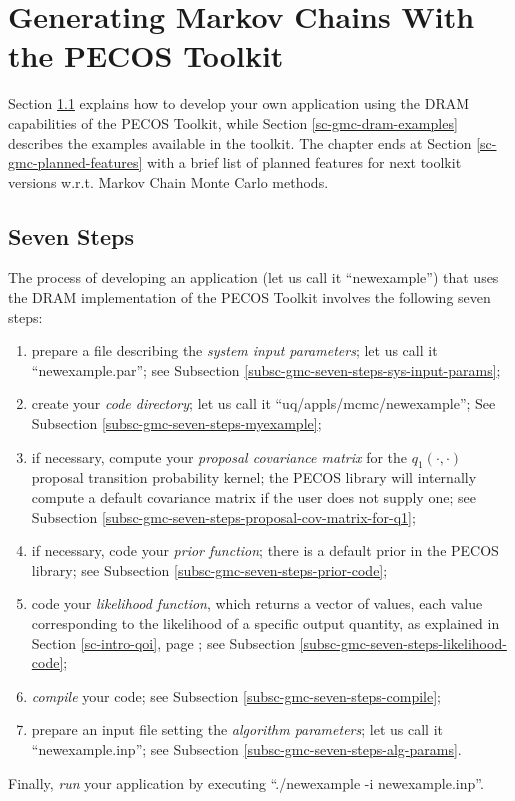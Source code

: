 \chapter{Generating Markov Chains With the PECOS Toolkit}\label{ch-gmc}
\thispagestyle{headings}

Section \ref{sc-gmc-seven-steps} explains how to develop your own application using the DRAM capabilities of the PECOS Toolkit, while
Section \ref{sc-gmc-dram-examples} describes the examples available in the toolkit.
The chapter ends at Section \ref{sc-gmc-planned-features} with a brief list of planned features for next toolkit versions w.r.t. Markov Chain Monte Carlo methods.

\section{Seven Steps}\label{sc-gmc-seven-steps}

The process of developing an application (let us call it ``newexample'') 
that uses the DRAM implementation of the PECOS Toolkit involves the following seven steps:
\begin{enumerate}
\item prepare a file describing the {\it system input parameters}; let us call it ``newexample.par''; see Subsection \ref{subsc-gmc-seven-steps-sys-input-params};
\item create your {\it code directory}; let us call it ``uq/appls/mcmc/newexample''; See Subsection \ref{subsc-gmc-seven-steps-myexample};
\item if necessary, compute your {\it proposal covariance matrix} for the $q_1(\cdot,\cdot)$ proposal transition probability kernel; the PECOS library will internally compute a default covariance matrix if the user does not supply one; see Subsection \ref{subsc-gmc-seven-steps-proposal-cov-matrix-for-q1};
\item if necessary, code your {\it prior function}; there is a default prior in the PECOS library; see Subsection \ref{subsc-gmc-seven-steps-prior-code};
\item code your {\it likelihood function}, which returns a vector of values, each value corresponding to the likelihood of a specific output quantity, as explained in Section \ref{sc-intro-qoi}, page \pageref{sc-intro-qoi}; see Subsection \ref{subsc-gmc-seven-steps-likelihood-code};
\item {\it compile} your code; see Subsection \ref{subsc-gmc-seven-steps-compile};
\item prepare an input file setting the {\it algorithm parameters}; let us call it ``newexample.inp''; see Subsection \ref{subsc-gmc-seven-steps-alg-params}.
\end{enumerate}
Finally, {\it run} your application by executing ``./newexample -i newexample.inp''.

